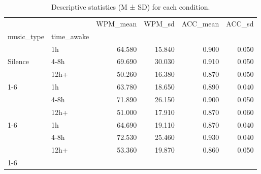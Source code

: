 
        \begin{table}[htbp]
            \centering
            \caption{Descriptive statistics (M ± SD) for each condition.}
            \label{tab:descr}
            \footnotesize
            \begin{tabular}{llrrrr}
\toprule
 &  & WPM_mean & WPM_sd & ACC_mean & ACC_sd \\
music_type & time_awake &  &  &  &  \\
\midrule
\multirow[t]{3}{*}{Silence} & 1h & 64.580 & 15.840 & 0.900 & 0.050 \\
 & 4-8h & 69.690 & 30.030 & 0.910 & 0.050 \\
 & 12h+ & 50.260 & 16.380 & 0.870 & 0.050 \\
\cline{1-6}
\multirow[t]{3}{*}{Classical} & 1h & 63.780 & 18.650 & 0.890 & 0.040 \\
 & 4-8h & 71.890 & 26.150 & 0.900 & 0.050 \\
 & 12h+ & 51.000 & 17.910 & 0.870 & 0.060 \\
\cline{1-6}
\multirow[t]{3}{*}{Hardstyle} & 1h & 64.690 & 19.110 & 0.870 & 0.040 \\
 & 4-8h & 72.530 & 25.460 & 0.930 & 0.040 \\
 & 12h+ & 53.360 & 19.870 & 0.860 & 0.050 \\
\cline{1-6}
\bottomrule
\end{tabular}

        \end{table}
